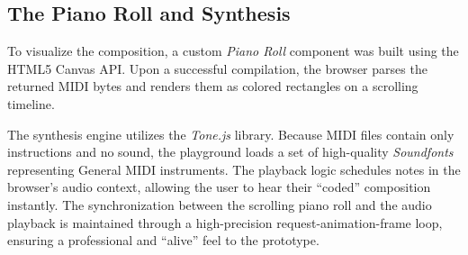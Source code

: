 \subsection{The Piano Roll and Synthesis}\label{subsec:the-piano-roll-and-synthesis}

To visualize the composition, a custom \textit{Piano Roll} component was built using the HTML5 Canvas API\@.
Upon a successful compilation, the browser parses the returned MIDI bytes and renders them as colored rectangles on a
scrolling timeline.

The synthesis engine utilizes the \textit{Tone.js} library.
Because MIDI files contain only instructions and no sound, the playground loads a set of high-quality
\textit{Soundfonts} representing General MIDI instruments.
The playback logic schedules notes in the browser's audio context, allowing the user to hear their ``coded'' composition
instantly.
The synchronization between the scrolling piano roll and the audio playback is maintained through a high-precision
request-animation-frame loop, ensuring a professional and ``alive'' feel to the prototype.

